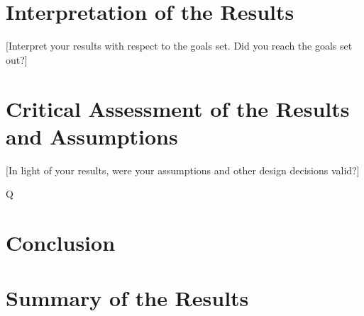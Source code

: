 \documentclass[lang=english,inputenc=utf8,fontsize=10pt]{ldvarticle}
\begin{document}
\lipsum[16]

\section*{Interpretation of the Results}
[Interpret your results with respect to the goals set. Did you reach the goals set out?] 

\lipsum[8]

\section*{Critical Assessment of the Results and Assumptions}
[In light of your results, were your assumptions and other design decisions valid?] 

\lipsum[17]

Q
\newpage

\section{Conclusion}

\lipsum[19]

\section*{Summary of the Results}

\lipsum[20]
\end{document}
